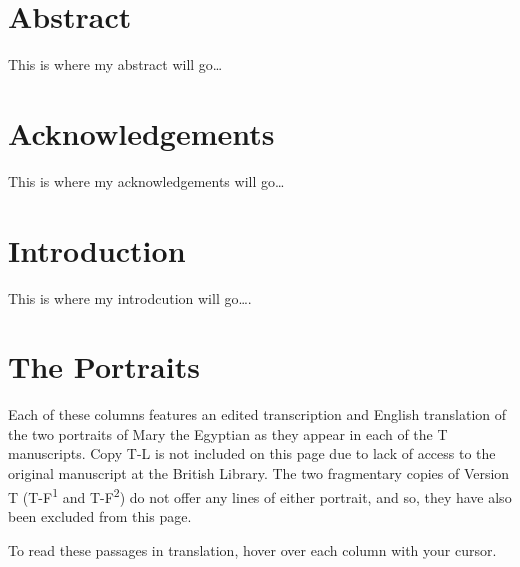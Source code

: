 \documentclass[
  letterpaper,
  DIV=11,
  numbers=noendperiod,
  oneside]{scrreprt}
\begin{document}

\chapter{Abstract}\label{abstract}

This is where my abstract will go\ldots{}


\chapter{Acknowledgements}\label{acknowledgements}

This is where my acknowledgements will go\ldots{}


\chapter{Introduction}\label{introduction}

This is where my introdcution will go\ldots.


\chapter{The Portraits}\label{the-portraits}

Each of these columns features an edited transcription and English
translation of the two portraits of Mary the Egyptian as they appear in
each of the T manuscripts. Copy T-L is not included on this page due to
lack of access to the original manuscript at the British Library. The
two fragmentary copies of Version T (T-F\textsuperscript{1} and
T-F\textsuperscript{2}) do not offer any lines of either portrait, and
so, they have also been excluded from this page.

To read these passages in translation, hover over each column with your
cursor.
\end{document}
